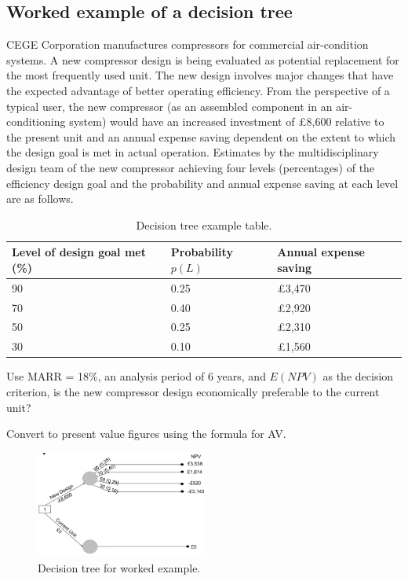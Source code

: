 \subsection{Worked example of a decision tree}
CEGE Corporation manufactures compressors for commercial air-condition systems. A new compressor design is being evaluated as potential replacement for the most frequently used unit. The new design involves major changes that have the expected advantage of better operating efficiency. From the perspective of a typical user, the new compressor (as an assembled component in an air-conditioning system) would have an increased investment of \pounds 8,600 relative to the present unit and an annual expense saving dependent on the extent to which the design goal is met in actual operation. Estimates by the multidisciplinary design team of the new compressor achieving four levels (percentages) of the efficiency design goal and the probability and annual expense saving at each level are as follows.
\begin{table}[H]
    \centering
    \begin{tabular}{@{}lll@{}}
        \toprule
        \textbf{Level of design goal met (\%)} & \textbf{Probability} $p\left(L\right)$ & \textbf{Annual expense saving} \\
        \midrule
        90                                     & 0.25                                   & \pounds 3,470                  \\
        70                                     & 0.40                                   & \pounds 2,920                  \\
        50                                     & 0.25                                   & \pounds 2,310                  \\
        30                                     & 0.10                                   & \pounds 1,560                  \\
        \bottomrule
    \end{tabular}
    \caption{Decision tree example table.}
\end{table}
\begin{quoting}
    Use MARR = 18\%, an analysis period of 6 years, and $E\left(NPV\right)$ as the decision criterion, is the new compressor design economically preferable to the current unit?
\end{quoting}
Convert to present value figures using the formula for AV.
\begin{figure}[H]
    \centering
    \includegraphics[width = 0.5\textwidth]{img/figure64.png}
    \caption{Decision tree for worked example.}
\end{figure}
